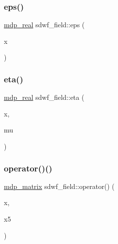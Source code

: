\mbox{\label{classsdwf__field_a3cc6aef9972ab5cceab9646578857db0}} 
\subsubsection{\texorpdfstring{eps()}{eps()}}
{\footnotesize\ttfamily \hyperlink{mdp__global__vars_8h_a69d96b74c791e0bbdb888b3913a69450}{mdp\+\_\+real} sdwf\+\_\+field\+::eps (\begin{DoxyParamCaption}\item[{\hyperlink{mdp__compatibility__macros_8h_aa6f1179c424e48adef1cedf7c436eb75}{site}}]{x }\end{DoxyParamCaption})\hspace{0.3cm}{\ttfamily [inline]}}

\mbox{\label{classsdwf__field_ae50c1b9db65cd8056ed9286bde99e791}} 
\subsubsection{\texorpdfstring{eta()}{eta()}}
{\footnotesize\ttfamily \hyperlink{mdp__global__vars_8h_a69d96b74c791e0bbdb888b3913a69450}{mdp\+\_\+real} sdwf\+\_\+field\+::eta (\begin{DoxyParamCaption}\item[{\hyperlink{mdp__compatibility__macros_8h_aa6f1179c424e48adef1cedf7c436eb75}{site}}]{x,  }\item[{int}]{mu }\end{DoxyParamCaption})\hspace{0.3cm}{\ttfamily [inline]}}

\mbox{\label{classsdwf__field_a18764312ba3bb72577b2e29429854024}} 
\subsubsection{\texorpdfstring{operator()()}{operator()()}\hspace{0.1cm}{\footnotesize\ttfamily [1/3]}}
{\footnotesize\ttfamily \hyperlink{classmdp__matrix}{mdp\+\_\+matrix} sdwf\+\_\+field\+::operator() (\begin{DoxyParamCaption}\item[{\hyperlink{mdp__compatibility__macros_8h_aa6f1179c424e48adef1cedf7c436eb75}{site}}]{x,  }\item[{int}]{x5 }\end{DoxyParamCaption})\hspace{0.3cm}{\ttfamily [inline]}}

